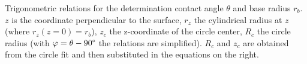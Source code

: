 \label{fig:Circle-Trigonometry}Trigonometric relations for the determination
contact angle $\theta$ and base radius $r_{b}$. $z$ is the coordinate
perpendicular to the surface, $r_{z}$ the cylindrical radius at $z$
(where $r_{z}(z=0)=r_{b}$), $z_{c}$ the z-coordinate of the circle
center, $R_{c}$ the circle radius (with $\varphi=\theta-90\text{\textdegree}$
the relations are simplified). $R_{c}$ and $z_{c}$ are obtained
from the circle fit and then substituted in the equations on the right.